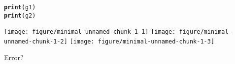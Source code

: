 \documentclass{article}\usepackage[]{graphicx}\usepackage[]{color}
\makeatletter
\def\maxwidth{ %
  \ifdim\Gin@nat@width>\linewidth
    \linewidth
  \else
    \Gin@nat@width
  \fi
}
\newcommand{\hlstd}[1]{\textcolor[rgb]{0.345,0.345,0.345}{#1}}%
\newcommand{\hlkwd}[1]{\textcolor[rgb]{0.737,0.353,0.396}{\textbf{#1}}}%
\newenvironment{kframe}{%
 \def\at@end@of@kframe{}%
 \ifinner\ifhmode%
  \def\at@end@of@kframe{\end{minipage}}%
  \begin{minipage}{\columnwidth}%
 \fi\fi%
 \def\FrameCommand##1{\hskip\@totalleftmargin \hskip-\fboxsep
 \colorbox{shadecolor}{##1}\hskip-\fboxsep
     \hskip-\linewidth \hskip-\@totalleftmargin \hskip\columnwidth}%
 \MakeFramed {\advance\hsize-\width
   \@totalleftmargin\z@ \linewidth\hsize
   \@setminipage}}%
 {\par\unskip\endMakeFramed%
 \at@end@of@kframe}
\newenvironment{knitrout}{}{} %
\makeatother
\begin{document}
\begin{knitrout}
\begin{kframe}
\begin{alltt}
\hlkwd{print}\hlstd{(g1)}
\hlkwd{print}\hlstd{(g2)}
\end{alltt}
\end{kframe}

{\centering \texttt{[image: figure/minimal-unnamed-chunk-1-1]} 
\texttt{[image: figure/minimal-unnamed-chunk-1-2]} 
\texttt{[image: figure/minimal-unnamed-chunk-1-3]} 

}



\end{knitrout}

Error?
\end{document}
